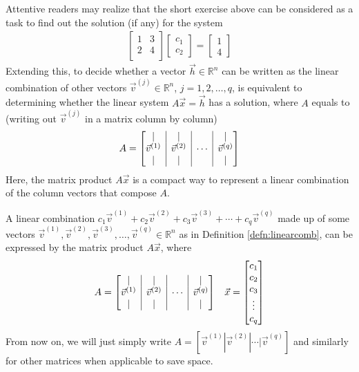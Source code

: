 Attentive readers may realize that the short exercise above can be considered as a task to find out the solution (if any) for the system
\begin{align*}
\begin{bmatrix}
1 & 3 \\
2 & 4 \\
\end{bmatrix}
\begin{bmatrix}
c_1 \\
c_2
\end{bmatrix} =
\begin{bmatrix}
1 \\
4
\end{bmatrix}
\end{align*}
Extending this, to decide whether a vector $\vec{h} \in \mathbb{R}^n$ can be written as the linear combination of other vectors $\vec{v}^{(j)} \in \mathbb{R}^n$, $j = 1, 2, \ldots, q$, is equivalent to determining whether the linear system $A\vec{x} = \vec{h}$ has a solution, where $A$ equals to (writing out $\vec{v}^{(j)}$ in a matrix column by column)
\begin{align*}
A = \left[\begin{array}{@{}c|c|c|c@{}}
| & | & & | \\
\vec{v}^{(1)} & \vec{v}^{(2)} & \cdots & \vec{v}^{(q)} \\
| & | & & |
\end{array}\right]
\end{align*}
Here, the matrix product $A\vec{x}$ is a compact way to represent a linear combination of the column vectors that compose $A$.
\begin{proper}
\label{proper:linearcombmatrix}
A linear combination $c_1\vec{v}^{(1)} + c_2\vec{v}^{(2)} + c_3\vec{v}^{(3)} + \cdots + c_q\vec{v}^{(q)}$ made up of some vectors $\vec{v}^{(1)}, \vec{v}^{(2)}, \vec{v}^{(3)}, \ldots, \vec{v}^{(q)} \in \mathbb{R}^n$ as in Definition \ref{defn:linearcomb}, can be expressed by the matrix product $A\vec{x}$, where
\begin{align*}
&A = \left[\begin{array}{@{}c|c|c|c@{}}
| & | & & | \\
\vec{v}^{(1)} & \vec{v}^{(2)} & \cdots & \vec{v}^{(q)} \\
| & | & & |
\end{array}\right]
&\vec{x} =
\begin{bmatrix}
c_1 \\
c_2 \\
c_3 \\
\vdots \\
c_q
\end{bmatrix}
\end{align*}
From now on, we will just simply write $A = [\vec{v}^{(1)} | \vec{v}^{(2)} | \cdots | \vec{v}^{(q)}]$ and similarly for other matrices when applicable to save space.
\end{proper}
